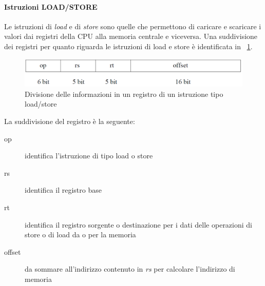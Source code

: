 \paragraph{Istruzioni LOAD/STORE}
Le istruzioni di \emph{load} e di \emph{store} sono quelle che permettono di caricare e scaricare i valori dai registri della CPU alla memoria centrale e viceversa.
Una suddivisione dei registri per quanto riguarda le istruzioni di load e store è identificata in \figurename~\ref{fig:loadstore}.\\
\begin{figure}[htb]
\centering
\includegraphics[scale=0.5]{img/loadstore.png}
\caption{Divisione delle informazioni in un registro di un istruzione tipo load/store}\label{fig:loadstore}
\end{figure}
La suddivisione del registro è la seguente:
\begin{description}
\item[op] identifica l'istruzione di tipo load o store
\item[rs] identifica il registro base
\item[rt] identifica il registro sorgente o destinazione per i dati delle operazioni di store o di load da o per la memoria
\item[offset] da sommare all'indirizzo contenuto in \emph{rs} per calcolare l'indirizzo di memoria
\end{description}
